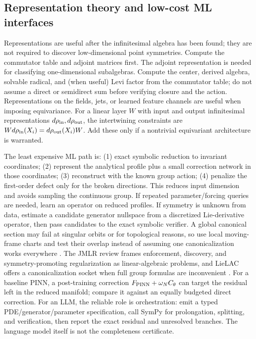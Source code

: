 \documentclass[11pt]{article}
\begin{document}
\subsection{Representation theory and low-cost ML interfaces}
Representations are useful after the infinitesimal algebra has been found;
they are not required to discover low-dimensional point symmetries. Compute
the commutator table and adjoint matrices first. The adjoint representation is
needed for classifying one-dimensional subalgebras. Compute the center,
derived algebra, solvable radical, and (when useful) Levi factor from the
commutator table; do not assume a direct or semidirect sum before verifying
closure and the action. Representations on the fields, jets, or learned
feature channels are useful when imposing equivariance. For a linear layer
$W$ with input and output infinitesimal representations $d\rho_{\rm in},
d\rho_{\rm out}$, the intertwining constraints are
$W d\rho_{\rm in}(X_i)=d\rho_{\rm out}(X_i)W$. Add these only if a
nontrivial equivariant architecture is warranted.

The least expensive ML path is: (1) exact symbolic reduction to invariant
coordinates; (2) represent the analytical profile plus a small correction
network in those coordinates; (3) reconstruct with the known group action;
(4) penalize the first-order defect only for the broken directions. This
reduces input dimension and avoids sampling the continuous group. If repeated
parameter/forcing queries are needed, learn an operator on reduced profiles.
If symmetry is unknown from data, estimate a candidate generator nullspace
from a discretized Lie-derivative operator, then pass candidates to the exact
symbolic verifier. A global canonical section may fail at singular orbits or
for topological reasons, so use local moving-frame charts and test their
overlap instead of assuming one canonicalization works everywhere
\cite{lieLAC}. The JMLR review frames enforcement, discovery, and
symmetry-promoting regularization as linear-algebraic problems, and LieLAC
offers a canonicalization socket when full group formulas are inconvenient
\cite{otto,lieLAC}. For a baseline PINN, a post-training correction
$F_{\rm PINN}+\omega_N C_\theta$ can target the residual left in the reduced
manifold; compare it against an equally budgeted direct correction. For an
LLM, the reliable role is orchestration: emit a typed PDE/generator/parameter
specification, call SymPy for prolongation, splitting, and verification, then
report the exact residual and unresolved branches. The language model itself
is not the completeness certificate.
\end{document}

